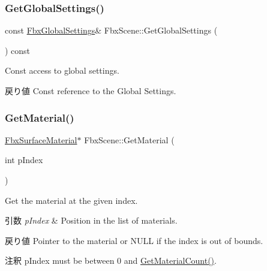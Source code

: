 \subsubsection{\texorpdfstring{Get\+Global\+Settings()}{GetGlobalSettings()}\hspace{0.1cm}{\footnotesize\ttfamily [2/2]}}
{\footnotesize\ttfamily const \hyperlink{class_fbx_global_settings}{Fbx\+Global\+Settings}\& Fbx\+Scene\+::\+Get\+Global\+Settings (\begin{DoxyParamCaption}{ }\end{DoxyParamCaption}) const}

Const access to global settings. \begin{DoxyReturn}{戻り値}
Const reference to the Global Settings. 
\end{DoxyReturn}
\mbox{\label{class_fbx_scene_aec766862a775be507f785d75ddc55cf5}} 
\subsubsection{\texorpdfstring{Get\+Material()}{GetMaterial()}\hspace{0.1cm}{\footnotesize\ttfamily [1/2]}}
{\footnotesize\ttfamily \hyperlink{class_fbx_surface_material}{Fbx\+Surface\+Material}$\ast$ Fbx\+Scene\+::\+Get\+Material (\begin{DoxyParamCaption}\item[{int}]{p\+Index }\end{DoxyParamCaption})}

Get the material at the given index. 
\begin{DoxyParams}{引数}
{\em p\+Index} & Position in the list of materials. \\
\hline
\end{DoxyParams}
\begin{DoxyReturn}{戻り値}
Pointer to the material or {\ttfamily N\+U\+LL} if the index is out of bounds. 
\end{DoxyReturn}
\begin{DoxyRemark}{注釈}
p\+Index must be between 0 and \hyperlink{class_fbx_scene_a098bcfeab04d64d1b7f900a09c09f381}{Get\+Material\+Count()}. 
\end{DoxyRemark}
\mbox{\label{class_fbx_scene_ad99587afc86a025c65fd150dcdbf885b}} 
